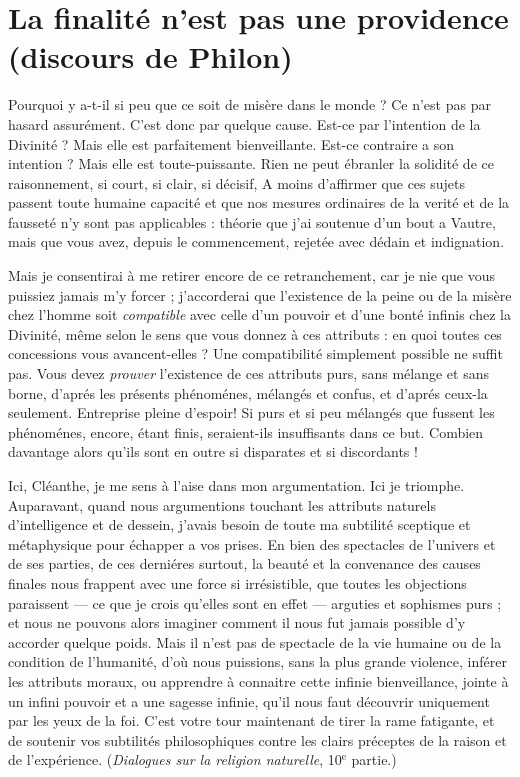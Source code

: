 
\section{La finalité n'est pas une providence (discours de Philon)}

Pourquoi y a-t-il si peu que ce soit de misère dans le
monde ? Ce n’est pas par hasard assurément. C’est donc
par quelque cause. Est-ce par l’intention de la Divinité ?
Mais elle est parfaitement bienveillante. Est-ce contraire
a son intention ? Mais elle est toute-puissante. Rien ne
peut ébranler la solidité de ce raisonnement, si court,
si clair, si décisif, A moins d’affirmer que ces sujets passent
toute humaine capacité et que nos mesures ordinaires
de la verité et de la fausseté n’y sont pas applicables :
théorie que j’ai soutenue d’un bout a Vautre, mais que
vous avez, depuis le commencement, rejetée avec dédain
et indignation.

Mais je consentirai à me retirer encore de ce retranchement,
car je nie que vous puissiez jamais m’y forcer ;
j’accorderai que l’existence de la peine ou de la misère
chez l'homme soit {\it compatible} avec celle d’un pouvoir et
d'une bonté infinis chez la Divinité, même selon le sens
que vous donnez à ces attributs : en quoi toutes ces concessions
vous avancent-elles ? Une compatibilité simplement
possible ne suffit pas. Vous devez {\it prouver} l’existence de
ces attributs purs, sans mélange et sans borne, d’aprés
les présents phénoménes, mélangés et confus, et d’aprés
ceux-la seulement. Entreprise pleine d’espoir! Si purs
et si peu mélangés que fussent les phénoménes, encore, étant
finis, seraient-ils insuffisants dans ce but. Combien davantage
alors qu’ils sont en outre si disparates et si discordants !

Ici, Cléanthe, je me sens à l’aise dans mon argumentation.
Ici je triomphe. Auparavant, quand nous argumentions
touchant les attributs naturels d’intelligence
et de dessein, j’avais besoin de toute ma subtilité sceptique
et métaphysique pour échapper a vos prises. En bien des
spectacles de l’univers et de ses parties, de ces derniéres
surtout, la beauté et la convenance des causes finales
nous frappent avec une force si irrésistible, que toutes les
objections paraissent — ce que je crois qu’elles sont en
effet — arguties et sophismes purs ; et nous ne pouvons
alors imaginer comment il nous fut jamais possible d’y
accorder quelque poids. Mais il n’est pas de spectacle de
la vie humaine ou de la condition de l’humanité, d’où
nous puissions, sans la plus grande violence, inférer les
attributs moraux, ou apprendre à connaitre cette infinie
bienveillance, jointe à un infini pouvoir et a une sagesse
infinie, qu’il nous faut découvrir uniquement par les
yeux de la foi. C’est votre tour maintenant de tirer la
rame fatigante, et de soutenir vos subtilités philosophiques
contre les clairs préceptes de la raison et de l’expérience.
({\it Dialogues sur la religion naturelle}, 10$^\text{e}$ partie.)

